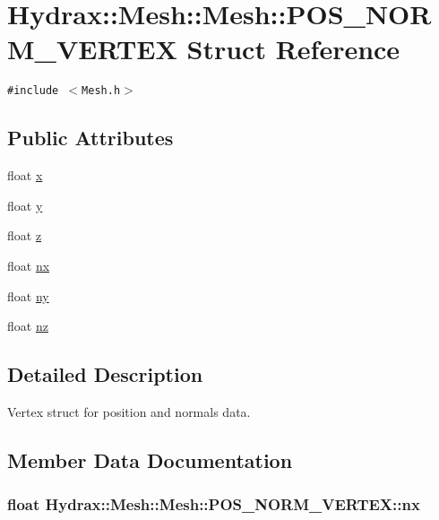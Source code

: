 \hypertarget{struct_hydrax_1_1_mesh_1_1_p_o_s___n_o_r_m___v_e_r_t_e_x}{
\section{Hydrax::Mesh::Mesh::POS\_\-NORM\_\-VERTEX Struct Reference}
\label{struct_hydrax_1_1_mesh_1_1_p_o_s___n_o_r_m___v_e_r_t_e_x}
}
{\tt \#include $<$Mesh.h$>$}

\subsection*{Public Attributes}
\begin{CompactItemize}
\item 
float \hyperlink{struct_hydrax_1_1_mesh_1_1_p_o_s___n_o_r_m___v_e_r_t_e_x_90c9cbd72a8993e556032a9c6744977b}{x}
\item 
float \hyperlink{struct_hydrax_1_1_mesh_1_1_p_o_s___n_o_r_m___v_e_r_t_e_x_a737e302fafc941a2c874a6e7e0a5d23}{y}
\item 
float \hyperlink{struct_hydrax_1_1_mesh_1_1_p_o_s___n_o_r_m___v_e_r_t_e_x_34ffa63a1b75d4d048c63918154f7f52}{z}
\item 
float \hyperlink{struct_hydrax_1_1_mesh_1_1_p_o_s___n_o_r_m___v_e_r_t_e_x_c2959e7039c0fff89ef8151d94c00e0b}{nx}
\item 
float \hyperlink{struct_hydrax_1_1_mesh_1_1_p_o_s___n_o_r_m___v_e_r_t_e_x_8a0e155d76fc4123cea4aac0ca8dd09d}{ny}
\item 
float \hyperlink{struct_hydrax_1_1_mesh_1_1_p_o_s___n_o_r_m___v_e_r_t_e_x_44d7bc3070618e856a1acb21d127fc4d}{nz}
\end{CompactItemize}


\subsection{Detailed Description}
Vertex struct for position and normals data. 

\subsection{Member Data Documentation}
\hypertarget{struct_hydrax_1_1_mesh_1_1_p_o_s___n_o_r_m___v_e_r_t_e_x_c2959e7039c0fff89ef8151d94c00e0b}{
\subsubsection[{nx}]{\setlength{\rightskip}{0pt plus 5cm}float Hydrax::Mesh::Mesh::POS\_\-NORM\_\-VERTEX::nx}}
\label{struct_hydrax_1_1_mesh_1_1_p_o_s___n_o_r_m___v_e_r_t_e_x_c2959e7039c0fff89ef8151d94c00e0b}


